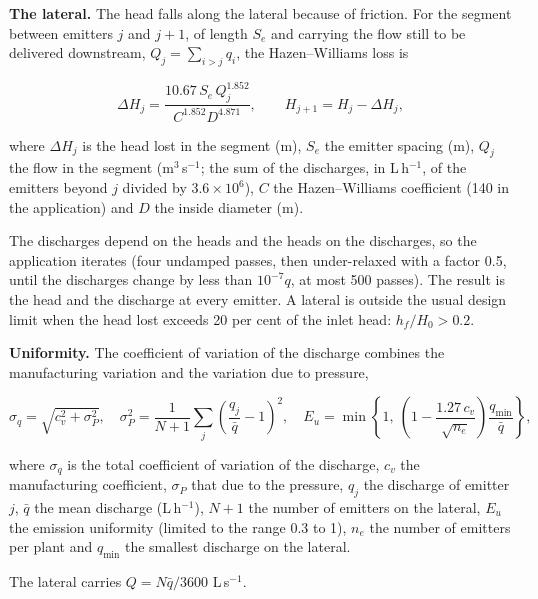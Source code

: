 \textbf{The lateral.} The head falls along the lateral because of friction. For the segment between emitters $j$ and $j+1$, of length $S_e$ and carrying the flow still to be delivered downstream, $Q_j=\sum_{i>j}q_i$, the Hazen--Williams loss is

\begin{equation}\boxed{\Delta H_j=\frac{10.67\,S_e\,Q_j^{1.852}}{C^{1.852}D^{4.871}},\qquad H_{j+1}=H_j-\Delta H_j,}\label{eq:d-hw}\end{equation}
\par\noindent where $\Delta H_j$ is the head lost in the segment (m), $S_e$ the emitter spacing (m), $Q_j$ the flow in the segment (m$^3$\,s$^{-1}$; the sum of the discharges, in L\,h$^{-1}$, of the emitters beyond $j$ divided by $3.6\times10^{6}$), $C$ the Hazen--Williams coefficient (140 in the application) and $D$ the inside diameter (m).



The discharges depend on the heads and the heads on the discharges, so the application iterates (four undamped passes, then under-relaxed with a factor 0.5, until the discharges change by less than $10^{-7}q$, at most 500 passes). The result is the head and the discharge at every emitter. A lateral is outside the usual design limit when the head lost exceeds 20 per cent of the inlet head: $h_f/H_0>0.2$.

\textbf{Uniformity.} The coefficient of variation of the discharge combines the manufacturing variation and the variation due to pressure,

\begin{equation}\sigma_q=\sqrt{c_v^2+\sigma_P^2},\quad\sigma_P^2=\frac{1}{N+1}\sum_j\left(\frac{q_j}{\bar q}-1\right)^2,\quad E_u=\min\left\{1,\ \left(1-\frac{1.27\,c_v}{\sqrt{n_e}}\right)\frac{q_{\min}}{\bar q}\right\},\label{eq:d-eu}\end{equation}
\par\noindent where $\sigma_q$ is the total coefficient of variation of the discharge, $c_v$ the manufacturing coefficient, $\sigma_P$ that due to the pressure, $q_j$ the discharge of emitter $j$, $\bar q$ the mean discharge (L\,h$^{-1}$), $N+1$ the number of emitters on the lateral, $E_u$ the emission uniformity (limited to the range 0.3 to 1), $n_e$ the number of emitters per plant and $q_{\min}$ the smallest discharge on the lateral.



The lateral carries $Q=N\bar q/3600$ L\,s$^{-1}$.

